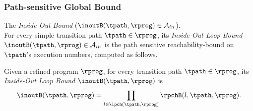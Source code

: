\subsubsection{Path-sensitive Global Bound}

The \emph{Inside-Out Bound} ($\inoutB(\tpath, \rprog) \in \mathcal{A}_{in}$).
\\
For every simple transition path $\tpath \in \rprog$,
its \emph{Inside-Out Loop Bound}
 $\inoutB(\tpath, \rprog) \in \mathcal{A}_{in}$ is 
the path sensitive reachability-bound on $\tpath$'s execution numbers,
computed as follows.
\begin{defn}
  \label{def:outin_bound}
  Given a refined program $\rprog$, for every transition path $\tpath \in \rprog$, 
  its \emph{Inside-Out Loop Bound}
  $\inoutB(\tpath, \rprog)$ is 
\[
  \inoutB(\tpath, \rprog) =
  \prod\limits_{l \in \lpch(\tpath, \rprog)} \rpchB(l, \tpath, \rprog).
\]
\end{defn}

